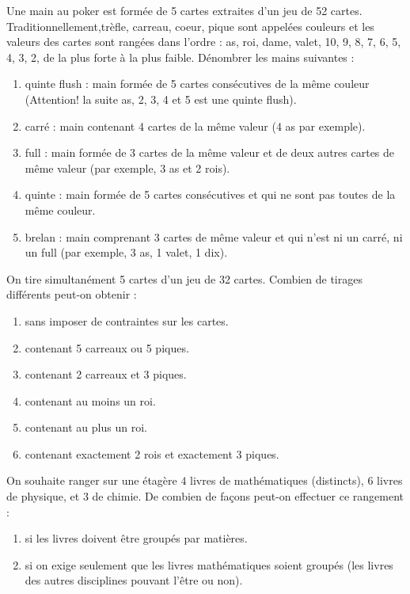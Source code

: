 \documentclass[../PolyS4.tex]{subfiles}
\begin{document}

\newpage


Une main au poker est formée de 5 cartes extraites d'un jeu de 52 cartes. Traditionnellement,trèfle, carreau, coeur, pique sont appelées couleurs et les valeurs des cartes sont rangées dans l'ordre : as, roi, dame, valet, 10, 9, 8, 7, 6, 5, 4, 3, 2, de la plus forte à la plus faible. Dénombrer les mains suivantes :
\begin{enumerate}
\item quinte flush : main formée de 5 cartes consécutives de la même couleur (Attention! la suite as, 2, 3, 4 et 5 est une quinte flush).
\item carré : main contenant 4 cartes de la même valeur (4 as par exemple).
\item full : main formée de 3 cartes de la même valeur et de deux autres cartes de même valeur (par exemple, 3 as et 2 rois).
\item quinte : main formée de 5 cartes consécutives et qui ne sont pas toutes de la même couleur.
\item brelan : main comprenant 3 cartes de même valeur et qui n'est ni un carré, ni un full (par exemple, 3 as, 1 valet, 1 dix).\\
\end{enumerate}





On tire simultanément 5 cartes d'un jeu de 32 cartes. Combien de tirages différents peut-on obtenir :
\begin{enumerate}
\item sans imposer de contraintes sur les cartes.
\item contenant 5 carreaux ou 5 piques.
\item contenant 2 carreaux et 3 piques.
\item contenant au moins un roi.
\item contenant au plus un roi.
\item contenant exactement 2 rois et exactement 3 piques.\\
\end{enumerate}





On souhaite ranger sur une étagère $4$ livres de mathématiques (distincts), $6$ livres de physique, et $3$ de chimie. De combien de façons peut-on effectuer ce rangement :
\begin{enumerate}
\item si les livres doivent être groupés par matières.
\item si on exige seulement que les livres mathématiques soient groupés (les livres des autres disciplines pouvant l'être ou non).\\
\end{enumerate}
\end{document}
